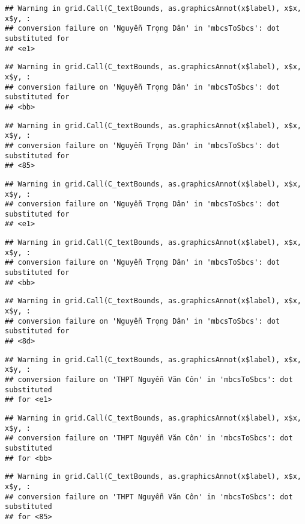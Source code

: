 \documentclass[
]{article}
\begin{document}
\begin{verbatim}
## Warning in grid.Call(C_textBounds, as.graphicsAnnot(x$label), x$x, x$y, :
## conversion failure on 'Nguyễn Trọng Dân' in 'mbcsToSbcs': dot substituted for
## <e1>
\end{verbatim}

\begin{verbatim}
## Warning in grid.Call(C_textBounds, as.graphicsAnnot(x$label), x$x, x$y, :
## conversion failure on 'Nguyễn Trọng Dân' in 'mbcsToSbcs': dot substituted for
## <bb>
\end{verbatim}

\begin{verbatim}
## Warning in grid.Call(C_textBounds, as.graphicsAnnot(x$label), x$x, x$y, :
## conversion failure on 'Nguyễn Trọng Dân' in 'mbcsToSbcs': dot substituted for
## <85>
\end{verbatim}

\begin{verbatim}
## Warning in grid.Call(C_textBounds, as.graphicsAnnot(x$label), x$x, x$y, :
## conversion failure on 'Nguyễn Trọng Dân' in 'mbcsToSbcs': dot substituted for
## <e1>
\end{verbatim}

\begin{verbatim}
## Warning in grid.Call(C_textBounds, as.graphicsAnnot(x$label), x$x, x$y, :
## conversion failure on 'Nguyễn Trọng Dân' in 'mbcsToSbcs': dot substituted for
## <bb>
\end{verbatim}

\begin{verbatim}
## Warning in grid.Call(C_textBounds, as.graphicsAnnot(x$label), x$x, x$y, :
## conversion failure on 'Nguyễn Trọng Dân' in 'mbcsToSbcs': dot substituted for
## <8d>
\end{verbatim}

\begin{verbatim}
## Warning in grid.Call(C_textBounds, as.graphicsAnnot(x$label), x$x, x$y, :
## conversion failure on 'THPT Nguyễn Văn Côn' in 'mbcsToSbcs': dot substituted
## for <e1>
\end{verbatim}

\begin{verbatim}
## Warning in grid.Call(C_textBounds, as.graphicsAnnot(x$label), x$x, x$y, :
## conversion failure on 'THPT Nguyễn Văn Côn' in 'mbcsToSbcs': dot substituted
## for <bb>
\end{verbatim}

\begin{verbatim}
## Warning in grid.Call(C_textBounds, as.graphicsAnnot(x$label), x$x, x$y, :
## conversion failure on 'THPT Nguyễn Văn Côn' in 'mbcsToSbcs': dot substituted
## for <85>
\end{verbatim}
\end{document}

